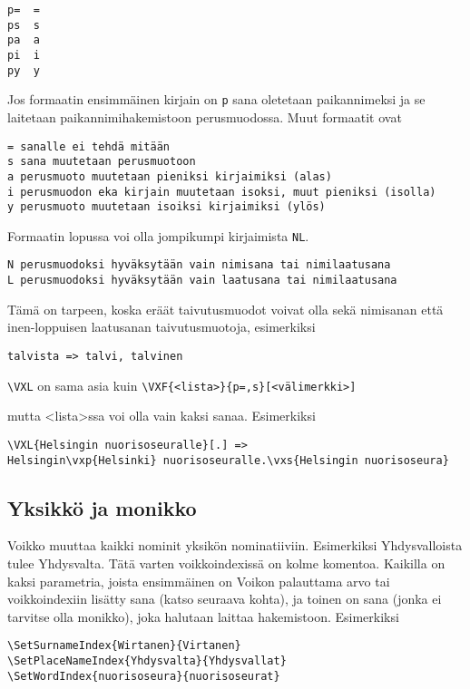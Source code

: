\documentclass[12pt]{article}
\begin{document}
\begin{verbatim}
p=  =
ps  s
pa  a
pi  i
py  y
\end{verbatim}

Jos formaatin ensimmäinen kirjain on \verb=p= sana oletetaan
paikannimeksi ja se laitetaan paikannimihakemistoon perusmuodossa.
Muut formaatit ovat

\begin{verbatim}
= sanalle ei tehdä mitään
s sana muutetaan perusmuotoon
a perusmuoto muutetaan pieniksi kirjaimiksi (alas)
i perusmuodon eka kirjain muutetaan isoksi, muut pieniksi (isolla)
y perusmuoto muutetaan isoiksi kirjaimiksi (ylös)
\end{verbatim}

Formaatin lopussa voi olla jompikumpi kirjaimista \verb=NL=.

\begin{verbatim}
N perusmuodoksi hyväksytään vain nimisana tai nimilaatusana
L perusmuodoksi hyväksytään vain laatusana tai nimilaatusana
\end{verbatim}

Tämä on tarpeen, koska eräät taivutusmuodot voivat olla sekä nimisanan
että inen-loppuisen laatusanan taivutusmuotoja, esimerkiksi

\verb|talvista => talvi, talvinen|


\verb=\VXL= on sama asia kuin \verb|\VXF{<lista>}{p=,s}[<välimerkki>]|

mutta <lista>ssa voi olla vain kaksi sanaa. Esimerkiksi

\begin{verbatim}
\VXL{Helsingin nuorisoseuralle}[.] =>
Helsingin\vxp{Helsinki} nuorisoseuralle.\vxs{Helsingin nuorisoseura}
\end{verbatim}


\subsection*{Yksikkö ja monikko}

Voikko muuttaa kaikki nominit yksikön nominatiiviin. Esimerkiksi
Yhdysvalloista tulee Yhdysvalta. Tätä varten voikkoindexissä on kolme
komentoa. Kaikilla on kaksi parametria, joista ensimmäinen on Voikon
palauttama arvo tai voikkoindexiin lisätty sana (katso seuraava
kohta), ja toinen on sana (jonka ei tarvitse olla monikko), joka
halutaan laittaa hakemistoon. Esimerkiksi

\begin{verbatim}
\SetSurnameIndex{Wirtanen}{Virtanen}
\SetPlaceNameIndex{Yhdysvalta}{Yhdysvallat}
\SetWordIndex{nuorisoseura}{nuorisoseurat}
\end{verbatim}
\end{document}
